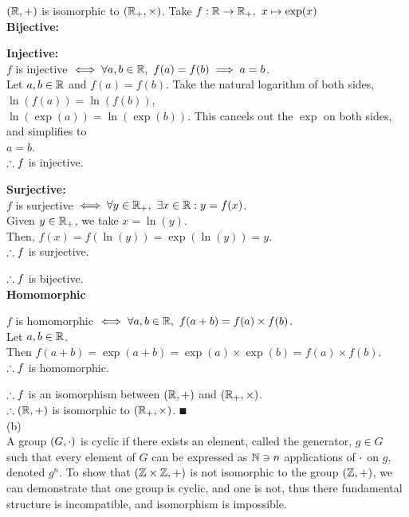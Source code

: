 \documentclass[a4paper, 11pt]{report}
\begin{document}
\Claim $(\mathbb{R},+)$ is isomorphic to $(\mathbb{R}_+,\times)$.
\proof Take $f: \mathbb{R}\to\mathbb{R}_+,\ x\mapsto\exp(x)$ \\

\textbf{Bijective:}
\begin{list}{}{\setlength{\leftmargin}{0.5in}\setlength{\topsep}{0pt}}\item
  \textbf{Injective:} \\
  $f$ is injective $\iff \forall a,b\in\bbr,\ f(a)=f(b)\implies a=b$. \\
  Let $a,b\in\mathbb{R}$ and $f(a)=f(b)$. Take the natural logarithm of both sides, \\
  $\ln(f(a)) = \ln(f(b))$,\\
  $\ln(\exp(a)) = \ln(\exp(b))$. This cancels out the $\exp$ on both sides, and simplifies to \\
  $a=b$. \\
  $\therefore f$ is injective.

  \textbf{Surjective:} \\
  $f$ is surjective $\iff \forall y\in\bbr_+,\ \exists x\in\bbr: y=f(x)$. \\
  Given $y\in\mathbb{R}_+$, we take $x=\ln(y)$. \\
  Then, $f(x) = f(\ln(y)) = \exp(\ln(y)) = y$. \\
  $\therefore f$ is surjective.
\end{list}
$\therefore f$ is bijective. \\

\textbf{Homomorphic}
\begin{list}{}{\setlength{\leftmargin}{0.5in}\setlength{\topsep}{0pt}}\item
  $f$ is homomorphic $\iff \forall a,b\in\bbr,\ f(a+b) = f(a)\times f(b)$. \\
  Let $a,b\in\mathbb{R}$. \\
  Then $f(a+b) = \exp(a+b) = \exp(a)\times\exp(b) = f(a)\times f(b)$. \\
  $\therefore f$ is homomorphic. \\
\end{list}

$\therefore f$ is an isomorphism between $(\mathbb{R},+)$ and $(\mathbb{R}_+,\times)$. \\
$\therefore (\mathbb{R},+)$ is isomorphic to $(\mathbb{R}_+,\times)$. $\QED$ \\

\newpage
\sol (b) \\
A group $(G,\cdot)$ is cyclic if there exists an element, called the generator, $g\in G$ such that every element of $G$ can be expressed as $\mathbb{N}\ni n$ applications of $\cdot$ on $g$, denoted $g^n$. To show that $(\mathbb{Z}\times\mathbb{Z},+)$ is not isomorphic to the group $(\mathbb{Z},+)$, we can demonstrate that one group is cyclic, and one is not, thus there fundamental structure is incompatible, and isomorphism is impossible. \\
\end{document}
